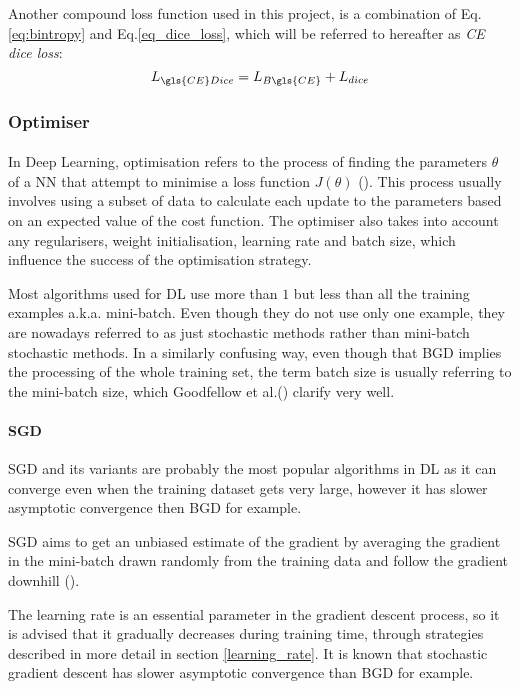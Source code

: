 Another compound loss function used in this project, is a combination of Eq.\ref{eq:bintropy} and Eq.\ref{eq_dice_loss}, which will be referred to hereafter as \textit{\gls{CE} dice loss}:
\begin{equation}
L_{\gls{CE} Dice} = L_{B\gls{CE}} + L_{dice}
\end{equation}
\subsubsection{Optimiser} \label{optimiser}
\paragraph{}
In Deep Learning, optimisation refers to the process of finding the parameters $\theta$ of a \gls{NN} that attempt to minimise a loss function $J(\theta)$ (\cite{GoodBengCour16}). This process usually involves using a subset of data to calculate each update to the parameters based on an expected value of the cost function. The optimiser also takes into account any regularisers, weight initialisation, learning rate and batch size, which influence the success of the optimisation strategy.

Most algorithms used for \gls{DL} use more than $1$ but less than all the training examples \gls{a.k.a.} mini-batch. Even though they do not use only one example, they are nowadays referred to as just stochastic methods rather than mini-batch stochastic methods. In a similarly confusing way, even though that \gls{BGD} implies the processing of the whole training set, the term batch size is usually referring to the mini-batch size, which Goodfellow et al.(\cite{GoodBengCour16}) clarify very well.
\paragraph{\gls{SGD}}
\gls{SGD} and its variants are probably the most popular algorithms in \gls{DL} as it can converge even when the training dataset gets very large, however it has slower asymptotic convergence then \gls{BGD} for example.

\gls{SGD} aims to get an unbiased estimate of the gradient by averaging the gradient in the mini-batch drawn randomly from the training data and follow the gradient downhill (\cite{GoodBengCour16}).

The learning rate is an essential parameter in the gradient descent process, so it is advised that it gradually decreases during training time, through strategies described in more detail in section \ref{learning_rate}. It is known that stochastic gradient descent has slower asymptotic convergence than \gls{BGD} for example.

